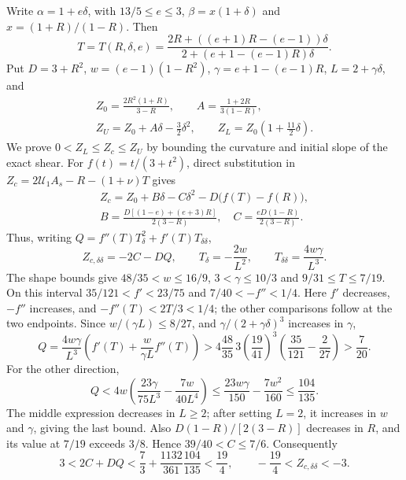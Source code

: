  Write $\alpha=1+e\delta$, with $13/5\le e\le3$,
$\beta=x(1+\delta)$ and $x=(1+R)/(1-R)$. Then
\[
 T=T(R,\delta,e)=
 \frac{2R+((e+1)R-(e-1))\delta}{2+(e+1-(e-1)R)\delta}.
\]
Put $D=3+R^2$, $w=(e-1)(1-R^2)$, $\gamma=e+1-(e-1)R$, $L=2+\gamma\delta$, and
\begin{gather*}
 Z_0=\frac{2R^2(1+R)}{3-R},\qquad A=\frac{1+2R}{3(1-R)},\\
 Z_U=Z_0+A\delta-\frac32\delta^2,\qquad
 Z_L=Z_0\left(1+\frac{11}{2}\delta\right).
\end{gather*}
We prove $0<Z_L\le Z_c\le Z_U$ by bounding the curvature and initial slope of the exact shear.
For $f(t)=t/(3+t^2)$, direct substitution in $Z_c=2\mathcal U_1A_s-R-(1+\nu)T$ gives
\begin{gather*}
 Z_c=Z_0+B\delta-C\delta^2-D\bigl(f(T)-f(R)\bigr),\\
 B=\frac{D[(1-e)+(e+3)R]}{2(3-R)},\quad
 C=\frac{eD(1-R)}{2(3-R)}.
\end{gather*}
Thus, writing $Q=f''(T)T_\delta^2+f'(T)T_{\delta\delta}$,
\[
 Z_{c,\delta\delta}=-2C-DQ,\qquad
 T_\delta=-\frac{2w}{L^2},\qquad T_{\delta\delta}=\frac{4w\gamma}{L^3}.
\]
The shape bounds give $48/35<w\le16/9$, $3<\gamma\le10/3$ and $9/31\le T\le7/19$.
On this interval $35/121<f'<23/75$ and $7/40<-f''<1/4$.
Here $f'$ decreases, $-f''$ increases, and $-f''(T)<2T/3<1/4$;
the other comparisons follow at the two endpoints.
Since $w/(\gamma L)\le8/27$, and $\gamma/(2+\gamma\delta)^3$ increases in $\gamma$,
\[
 Q=\frac{4w\gamma}{L^3}
       \left(f'(T)+\frac{w}{\gamma L}f''(T)\right)
 >4\frac{48}{35}\,3\left(\frac{19}{41}\right)^3
       \left(\frac{35}{121}-\frac2{27}\right)>\frac7{20}.
\]
For the other direction,
\[
 Q<4w\left(\frac{23\gamma}{75L^3}-\frac{7w}{40L^4}\right)
 \le\frac{23w\gamma}{150}-\frac{7w^2}{160}\le\frac{104}{135}.
\]
The middle expression decreases in $L\ge2$; after setting $L=2$, it increases in $w$ and
$\gamma$, giving the last bound. Also $D(1-R)/[2(3-R)]$ decreases in $R$, and its value at
$7/19$ exceeds $3/8$. Hence $39/40<C\le7/6$. Consequently
\[
 3<2C+DQ<\frac73+\frac{1132}{361}\frac{104}{135}<\frac{19}{4},
 \qquad -\frac{19}{4}<Z_{c,\delta\delta}<-3.
\]


